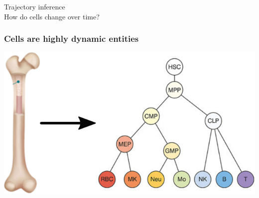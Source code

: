 \documentclass[usepdftitle=false, compress]{beamer}
\begin{document}
\begin{frame}
\end{frame}


\begin{frame}
	\vfill
	\begin{center}
		\color{set1blue}
		{\LARGE Trajectory inference} \\
		How do cells change over time?
	\end{center}
	\vfill
\end{frame}

\begin{frame}
	\frametitle{Cells are highly dynamic entities}
	\begin{center}
		\includegraphics[width=.6\linewidth]{figures/3_dynamiccells.pdf}
	\end{center}
\end{frame}
\end{document}
